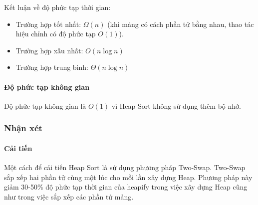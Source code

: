 Kết luận về độ phức tạp thời gian:

 \begin{itemize}
    \item Trường hợp tốt nhất: $\Omega(n)$ (khi mảng có cách phần tử bằng nhau, thao tác hiệu chỉnh có độ phức tạp $O(1)$).
    \item Trường hợp xấu nhất: $O(n\log{n})$
    \item Trường hợp trung bình: $\Theta(n\log{n})$
\end{itemize}

\paragraph{Độ phức tạp không gian}

Độ phức tạp không gian là $O(1)$ vì Heap Sort không sử dụng thêm bộ nhớ.

\subsubsection{Nhận xét}

\paragraph{Cải tiến} Một cách để cải tiến Heap Sort là sử dụng phương pháp Two-Swap. Two-Swap sắp xếp hai phần tử cùng một lúc cho mỗi lần xây dựng Heap. Phương pháp này giảm 30-50\% độ phức tạp thời gian của heapify trong việc xây dựng Heap cũng như trong việc sắp xếp các phần tử mảng. \cite{10.1007/978-3-319-11933-5_78}
